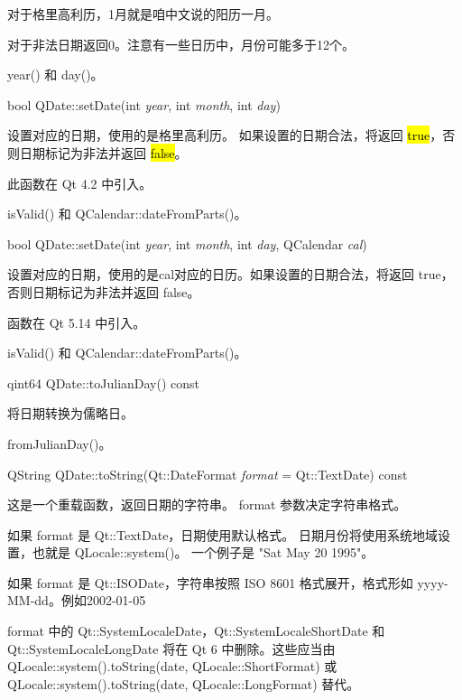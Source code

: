 对于格里高利历，1月就是咱中文说的阳历一月。

对于非法日期返回0。注意有一些日历中，月份可能多于12个。



\begin{seeAlso}
 year() 和 day()。
\end{seeAlso}

\splitLine

bool QDate::setDate(int \emph{year}, int  \emph{month}, int \emph{day})

设置对应的日期，使用的是格里高利历。 如果设置的日期合法，将返回
\hl{true}，否则日期标记为非法并返回 \hl{false}。

此函数在 Qt 4.2 中引入。


\begin{seeAlso}
isValid() 和 QCalendar::dateFromParts()。
\end{seeAlso}

\splitLine

bool QDate::setDate(int \emph{year}, int \emph{month}, int \emph{day}, QCalendar \emph{cal})

设置对应的日期，使用的是cal对应的日历。如果设置的日期合法，将返回 true，否则日期标记为非法并返回 false。

函数在 Qt 5.14 中引入。

\begin{seeAlso}
isValid() 和 QCalendar::dateFromParts()。
\end{seeAlso}

\splitLine

qint64 QDate::toJulianDay() const

将日期转换为儒略日。

\begin{seeAlso}
fromJulianDay()。
\end{seeAlso}

\splitLine

QString QDate::toString(Qt::DateFormat \emph{format} = Qt::TextDate) const

这是一个重载函数，返回日期的字符串。 format 参数决定字符串格式。

如果 format 是 Qt::TextDate，日期使用默认格式。
日期月份将使用系统地域设置，也就是 QLocale::system()。
一个例子是 "Sat May 20 1995"。

如果 format 是 Qt::ISODate，字符串按照 ISO 8601 格式展开，格式形如 yyyy-MM-dd。例如2002-01-05

format 中的 Qt::SystemLocaleDate，Qt::SystemLocaleShortDate 和Qt::SystemLocaleLongDate 将在 Qt 6 中删除。这些应当由 QLocale::system().toString(date, QLocale::ShortFormat) 或 QLocale::system().toString(date, QLocale::LongFormat) 替代。

